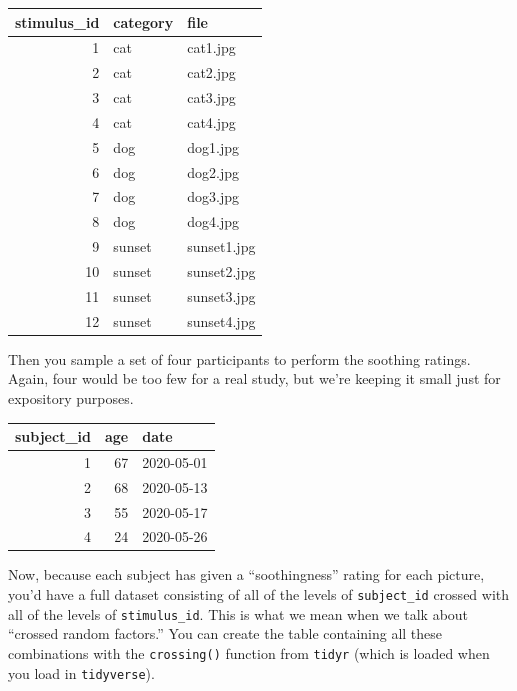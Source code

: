 \documentclass[]{book}
\newenvironment{Shaded}{\begin{snugshade}}{\end{snugshade}}
\newcommand{\KeywordTok}[1]{\textcolor[rgb]{0.13,0.29,0.53}{\textbf{#1}}}
\newcommand{\NormalTok}[1]{#1}
\newcommand{\OperatorTok}[1]{\textcolor[rgb]{0.81,0.36,0.00}{\textbf{#1}}}
\newcommand{\StringTok}[1]{\textcolor[rgb]{0.31,0.60,0.02}{#1}}
\begin{document}
\begin{tabular}{r|l|l}
\hline
stimulus\_id & category & file\\
\hline
1 & cat & cat1.jpg\\
\hline
2 & cat & cat2.jpg\\
\hline
3 & cat & cat3.jpg\\
\hline
4 & cat & cat4.jpg\\
\hline
5 & dog & dog1.jpg\\
\hline
6 & dog & dog2.jpg\\
\hline
7 & dog & dog3.jpg\\
\hline
8 & dog & dog4.jpg\\
\hline
9 & sunset & sunset1.jpg\\
\hline
10 & sunset & sunset2.jpg\\
\hline
11 & sunset & sunset3.jpg\\
\hline
12 & sunset & sunset4.jpg\\
\hline
\end{tabular}

Then you sample a set of four participants to perform the soothing ratings. Again, four would be too few for a real study, but we're keeping it small just for expository purposes.

\begin{tabular}{r|r|l}
\hline
subject\_id & age & date\\
\hline
1 & 67 & 2020-05-01\\
\hline
2 & 68 & 2020-05-13\\
\hline
3 & 55 & 2020-05-17\\
\hline
4 & 24 & 2020-05-26\\
\hline
\end{tabular}

Now, because each subject has given a ``soothingness'' rating for each picture, you'd have a full dataset consisting of all of the levels of \texttt{subject\_id} crossed with all of the levels of \texttt{stimulus\_id}. This is what we mean when we talk about ``crossed random factors.'' You can create the table containing all these combinations with the \texttt{crossing()} function from \texttt{tidyr} (which is loaded when you load in \texttt{tidyverse}).

\begin{Shaded}
\end{Shaded}
\end{document}
